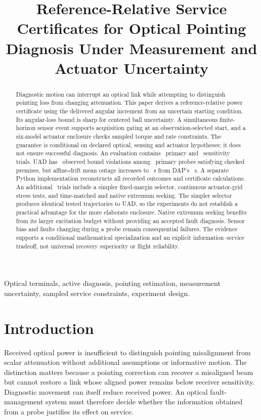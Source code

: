 \documentclass[10pt,journal]{IEEEtran}
\begin{document}
\title{Reference-Relative Service Certificates for Optical Pointing Diagnosis Under Measurement and Actuator Uncertainty}
\author{}
\maketitle
\begin{abstract}
Diagnostic motion can interrupt an optical link while attempting to distinguish pointing loss from changing attenuation. This paper derives a reference-relative power certificate using the delivered angular increment from an uncertain starting condition. Its angular-loss bound is sharp for centered ball uncertainty. A simultaneous finite-horizon sensor event supports acquisition gating at an observation-selected start, and a six-model actuator enclosure checks sampled torque and rate constraints. The guarantee is conditional on declared optical, sensing and actuator hypotheses; it does not ensure successful diagnosis. An evaluation contains \NPrimary\ primary and \NSensitivity\ sensitivity trials. UAD has \ValidViolations\ observed bound violations among \ValidCertificates\ primary probes satisfying checked premises, but affine-drift mean outage increases to \UADDriftOutage~s from DAP's \DAPDriftOutage~s. A separate Python implementation reconstructs all recorded outcomes and certificate calculations. An additional \NewTrials\ trials include a simpler fixed-margin selector, continuous actuator-grid stress tests, and time-matched and native extremum seeking. The simpler selector produces identical tested trajectories to UAD, so the experiments do not establish a practical advantage for the more elaborate enclosure. Native extremum seeking benefits from its larger excitation budget without providing an accepted fault diagnosis. Sensor bias and faults changing during a probe remain consequential failures. The evidence supports a conditional mathematical specialization and an explicit information--service tradeoff, not universal recovery superiority or flight reliability.
\end{abstract}
\begin{IEEEkeywords}
Optical terminals, active diagnosis, pointing estimation, measurement uncertainty, sampled service constraints, experiment design.
\end{IEEEkeywords}

\section{Introduction}
Received optical power is insufficient to distinguish pointing misalignment from scalar attenuation without additional assumptions or informative motion. The distinction matters because a pointing correction can recover a misaligned beam but cannot restore a link whose aligned power remains below receiver sensitivity. Diagnostic movement can itself reduce received power. An optical fault-management system must therefore decide whether the information obtained from a probe justifies its effect on service.
\end{document}
